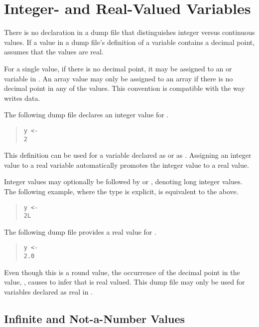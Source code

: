 \section{Integer- and Real-Valued Variables}

There is no declaration in a dump file that distinguishes integer
versus continuous values.  If a value in a dump file's definition of a
variable contains a decimal point, \Stan assumes that the values are
real.  

For a single value, if there is no decimal point, it may be assigned
to an  or  variable in \Stan.  An array value may
only be assigned to an  array if there is no decimal point
in any of the values.  This convention is compatible with the way \R
writes data.

The following dump file declares an integer value for .
%
\begin{quote}
\begin{Verbatim} 
y <- 
2
\end{Verbatim}
\end{quote}
% 
This definition can be used for a \Stan variable  declared as
 or as .  Assigning an integer value to a real
variable automatically promotes the integer value to a real value.

Integer values may optionally be followed by  or ,
denoting long integer values.  The following example, where the type is
explicit, is equivalent to the above.
%
\begin{quote}
\begin{Verbatim} 
y <- 
2L
\end{Verbatim}
\end{quote}

The following dump file provides a real value for .
%
\begin{quote}
\begin{Verbatim}[fontsize=\small]
y <-
2.0
\end{Verbatim}
\end{quote}
%
Even though this is a round value, the occurrence of the decimal
point in the value, , causes \Stan to infer that  is
real valued.  This dump file may only be used for variables 
declared as real in \Stan.


\subsection{Infinite and Not-a-Number Values}

